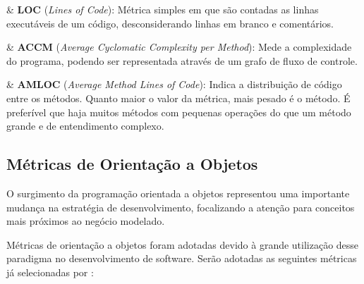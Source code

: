 \begin{easylist}[itemize]

	& \textbf{LOC} (\textit{Lines of Code}): Métrica simples em que são contadas as linhas executáveis de um código, desconsiderando linhas em branco e comentários.  \cite{metricsandmodels} 
		
	& \textbf{ACCM} (\textit{Average Cyclomatic Complexity per Method}): Mede a complexidade do programa, podendo ser representada através de um grafo de fluxo de controle. \cite{McCabe76}

	& \textbf{AMLOC} (\textit{Average Method Lines of Code}): Indica a distribuição de código entre os métodos. Quanto maior o valor da métrica, mais pesado é o método. É preferível que haja muitos métodos com pequenas operações do que um método grande e de entendimento complexo. \cite{Meirelles2013}
	
\end{easylist}

\subsection{Métricas de Orientação a Objetos}

O surgimento da programação orientada a objetos representou uma importante mudança na estratégia de desenvolvimento, focalizando a atenção para conceitos mais próximos ao negócio modelado. \cite{phpmysql}  

Métricas de orientação a objetos foram adotadas devido à grande utilização desse paradigma no desenvolvimento de software. Serão adotadas as seguintes métricas já selecionadas por :  


